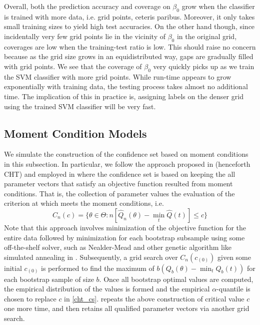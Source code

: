\documentclass[12pt]{article}
\theoremstyle{definition}
\begin{document}
Overall, both the prediction accuracy and coverage on $\beta_0$ grow when the classifier is trained with more data, i.e. grid points, ceteris paribus. Moreover, it only takes small training sizes to yield high test accuracies. On the other hand though, since incidentally very few grid points lie in the vicinity of $\beta_0$ in the original grid, coverages are low  when the training-test ratio is low. This should raise no concern because as the grid size grows in an equidistributed way, gaps are gradually filled with grid points. We see that the coverage of $\beta_0$ very quickly picks up as we train the SVM classifier with more grid points.  While run-time appears to grow exponentially with training data, the testing process takes almost no additional time. The implication of this in practice is, assigning labels on the denser grid using the trained SVM classifier will be very fast. 



\subsection{Moment Condition Models}\label{simulation_cht}
We simulate the construction of the confidence set based on moment conditions in this subsection. In particular, we follow the approach proposed in \cite{CHT2007} (henceforth CHT) and employed in \cite{Ciliberto_Tamer} where the confidence set is based on keeping the all parameter vectors that satisfy an objective function resulted from moment conditions. That is, the collection of parameter values the evaluation of the criterion at which meets the moment conditions, i.e. 
\begin{equation}\label{cht_cs}
C_n(c)=\{\theta\in\Theta:n[\hat{Q}_n(\theta) - \min_t\hat{Q}(t)]\leq c\}
\end{equation}
Note that this approach involves minimization of the objective function for the entire data followed by minimization for each bootstrap subsample using some off-the-shelf solver, such as Nealder-Mead and other genetic algorithm like simulated annealing in \cite{Ciliberto_Tamer}. Subsequently, a grid search over $C_n(c_{(0)})$ given some initial $c_{(0)}$ is performed to find the maximum of $b(Q_b(\theta)-\min_t Q_b(t))$ for each bootstrap sample of size $b$. Once all bootstrap optimal values are computed, the empirical distribution of the values is formed and the empirical $\alpha$-quantile is chosen to replace $c$ in \ref{cht_cs}. \cite{Ciliberto_Tamer} repeats the above construction of critical value $c$ one more time, and then retains all qualified parameter vectors via another grid search. 
\end{document}

